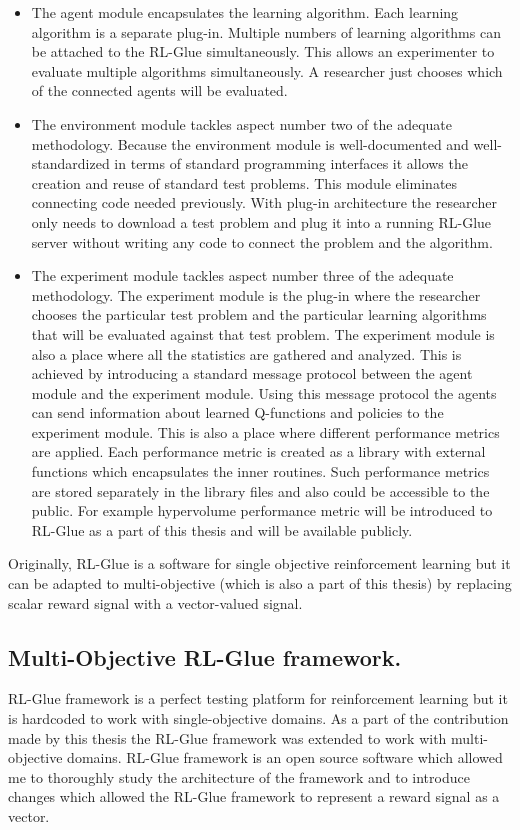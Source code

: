 \begin{itemize}

\item The agent module encapsulates the learning algorithm. Each learning algorithm is a separate plug-in. Multiple numbers of learning algorithms can be attached to the RL-Glue simultaneously. This allows an experimenter to evaluate multiple algorithms simultaneously. A researcher just chooses which of the connected agents will be evaluated.

\item The environment module tackles aspect number two of the adequate methodology. Because the environment module is well-documented and well-standardized in terms of standard programming interfaces it allows the creation and reuse of standard test problems. This module eliminates connecting code needed previously. With plug-in architecture the researcher only needs to download a test problem and plug it into a running RL-Glue server without writing any code to connect the problem and the algorithm.

\item The experiment module tackles aspect number three of the adequate methodology. The experiment module is the plug-in where the researcher chooses the particular test problem and the particular learning algorithms that will be evaluated against that test problem. The experiment module is also a place where all the statistics are gathered and analyzed. This is achieved by introducing a standard message protocol between the agent module and the experiment module. Using this message protocol the agents can send information about learned Q-functions and policies to the experiment module. This is also a place where different performance metrics are applied. Each performance metric is created as a library with external functions which encapsulates the inner routines. Such performance metrics are stored separately in the library files and also could be accessible to the public. For example hypervolume performance metric will be introduced to RL-Glue as a part of this thesis and will be available publicly.

\end{itemize}

Originally, RL-Glue is a software for single objective reinforcement learning but it can be adapted to multi-objective (which is also a part of this thesis) by replacing scalar reward signal with a vector-valued signal.

\subsection{Multi-Objective RL-Glue framework.}
RL-Glue framework is a perfect testing platform for reinforcement learning but it is hardcoded to work with single-objective domains. As a part of the contribution made by this thesis the RL-Glue framework was extended to work with multi-objective domains. RL-Glue framework is an open source software which allowed me to thoroughly study the architecture of the framework and to introduce changes which allowed the RL-Glue framework to represent a reward signal as a vector.

